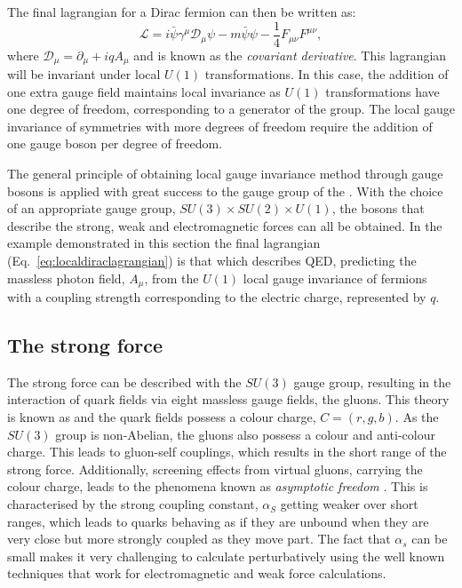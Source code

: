 The final lagrangian for a Dirac fermion can then be written as:
\begin{equation}
  \label{eq:localdiraclagrangian}
  \mathcal{L}=i\bar{\psi}\gamma^{\mu}\mathcal{D}_{\mu}\psi-m\bar{\psi}\psi-\frac{1}{4}F_{\mu\nu}F^{\mu\nu},
\end{equation}
where $\mathcal{D}_{\mu}=\partial_{\mu}+iqA_{\mu}$ and is known as the
\emph{covariant derivative}. This lagrangian will be invariant under
local $U(1)$ transformations. In this case, the addition of one extra
gauge field maintains local invariance as $U(1)$ transformations have
one degree of freedom, corresponding to a generator of the group.
The local gauge invariance of symmetries with more degrees of freedom
require the addition of one gauge boson per degree of freedom. 

The general principle of obtaining local gauge invariance method
through gauge bosons is applied with great success to the gauge group
of the \SM. With the choice of an appropriate gauge group,
$SU(3)\times SU(2) \times U(1)$, the bosons that describe the strong,
weak and electromagnetic forces can all be obtained. In the example
demonstrated in this section the final lagrangian
(Eq.~\ref{eq:localdiraclagrangian}) is that which describes \ac{QED},
predicting the massless photon field, $A_{\mu}$, from the $U(1)$ local
gauge invariance of fermions with a coupling strength corresponding to
the electric charge, represented by $q$. %

\subsection{The strong force}

The strong force can be described with the $SU(3)$ gauge group,
resulting in the interaction of quark fields
via eight massless gauge fields, the gluons. This theory is known as \QCD and
the quark fields possess a colour charge, $C=(r,g,b)$. As the
$SU(3)$ group is non-Abelian, the gluons also possess a colour and
anti-colour charge. This leads to gluon-self couplings, which
results in the short range of the strong force. Additionally,
screening effects from virtual gluons, carrying the colour charge,
leads to the phenomena known as \emph{asymptotic freedom}
\cite{PhysRevLett.30.1343}. This is characterised by the strong coupling constant, $\alpha_S$
getting weaker over short ranges, which leads to quarks behaving as if
they are unbound when they are very close but more strongly coupled as
they move part. The fact that $\alpha_s$ can be small makes it very
challenging to calculate \QCD perturbatively using the well known
techniques that work for electromagnetic and weak force calculations.

